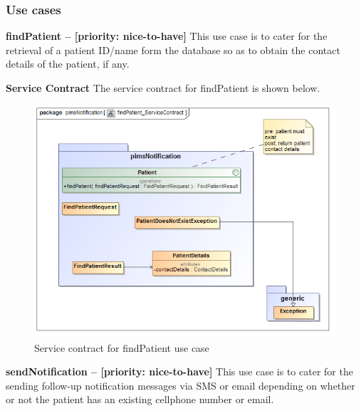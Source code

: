\subsubsection{Use cases}
\begin{description}
	\item{\textbf{findPatient -- [priority: nice-to-have]}}
	This use case is to cater for the retrieval of a patient ID/name form the database so as to obtain the contact details of the patient, if any.
	\begin{description}
		\item{\textbf{Service Contract}} The service contract for findPatient is shown below.
		\begin{figure}[H]
			\centerline{\includegraphics[width=0.7\linewidth]{./Graphics/pimsNotification/findPatient_ServiceContract}}
			\caption{Service contract for findPatient use case}
		\end{figure}
	\end{description}	
	
	\item{\textbf{sendNotification -- [priority: nice-to-have]}}
	This use case is to cater for the sending follow-up notification messages via SMS or email depending on whether or not the patient has an existing cellphone number or email.
	

\end{description}
